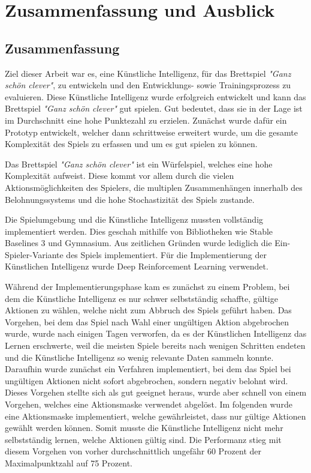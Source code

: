 \section{Zusammenfassung und Ausblick}
\subsection{Zusammenfassung}
Ziel dieser Arbeit war es, eine Künstliche Intelligenz, für das Brettspiel \textit{"Ganz schön clever"}, zu entwickeln und den Entwicklungs- sowie Trainingsprozess zu evaluieren.
Diese Künstliche Intelligenz wurde erfolgreich entwickelt und kann das Brettspiel \textit{"Ganz schön clever"} gut spielen. Gut bedeutet, dass sie in der Lage ist im Durchschnitt eine hohe Punktezahl zu erzielen. Zunächst wurde dafür ein Prototyp entwickelt, welcher dann schrittweise erweitert wurde, um die gesamte Komplexität des Spiels zu erfassen und um es gut spielen zu können.

Das Brettspiel \textit{"Ganz schön clever"} ist ein Würfelspiel, welches eine hohe Komplexität aufweist. Diese kommt vor allem durch die vielen Aktionsmöglichkeiten des Spielers, die multiplen Zusammenhängen innerhalb des Belohnungssystems und die hohe Stochastizität des Spiels zustande.

Die Spielumgebung und die Künstliche Intelligenz mussten vollständig implementiert werden. Dies geschah mithilfe von Bibliotheken wie Stable Baselines 3 und Gymnasium. Aus zeitlichen Gründen wurde lediglich die Ein-Spieler-Variante des Spiels implementiert. Für die Implementierung der Künstlichen Intelligenz wurde Deep Reinforcement Learning verwendet.

Während der Implementierungsphase kam es zunächst zu einem Problem, bei dem die Künstliche Intelligenz es nur schwer selbstständig schaffte, gültige Aktionen zu wählen, welche nicht zum Abbruch des Spiels geführt haben. Das Vorgehen, bei dem das Spiel nach Wahl einer ungültigen Aktion abgebrochen wurde, wurde nach einigen Tagen verworfen, da es der Künstlichen Intelligenz das Lernen erschwerte, weil die meisten Spiele bereits nach wenigen Schritten endeten und die Künstliche Intelligenz so wenig relevante Daten sammeln konnte. Daraufhin wurde zunächst ein Verfahren implementiert, bei dem das Spiel bei ungültigen Aktionen nicht sofort abgebrochen, sondern negativ belohnt wird. Dieses Vorgehen stellte sich als gut geeignet heraus, wurde aber schnell von einem Vorgehen, welches eine Aktionsmaske verwendet abgelöst. Im folgenden wurde eine Aktionsmaske implementiert, welche gewährleistet, dass nur gültige Aktionen gewählt werden können. Somit musste die Künstliche Intelligenz nicht mehr selbstständig lernen, welche Aktionen gültig sind. Die Performanz stieg mit diesem Vorgehen von vorher durchschnittlich ungefähr 60 Prozent der Maximalpunktzahl auf 75 Prozent.

